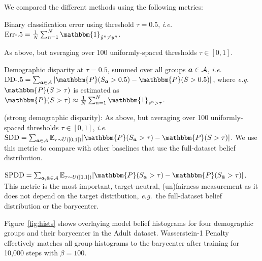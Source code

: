 \documentclass[letterpaper]{article}
\newcommand{\ie}{\emph{i.e.}}
\newcommand{\eg}{\emph{e.g.}}
\theoremstyle{definition}
\newcommand{\Sa}{S_{\va}}
\begin{document}
We compared the different methods using the following metrics:
\begin{description}
\setlength{\itemsep}{-6pt}  
\setlength{\parskip}{-4pt}
\setlength{\parsep}{-4pt}
\item[{\bf Err-.5:}] Binary classification error using threshold $\tau=0.5$, \ie~$\textrm{Err-.5} =\frac{1}{N}\sum_{n=1}^N\mathbbm{1}_{\hat y^n \neq y^n}$.\\
\item[{\bf Err-Exp:}] As above, but averaging over 100 uniformly-spaced thresholds $\tau \in [0,1]$.\\ 
\item[{\bf DD-.5:}] Demographic disparity at $\tau = 0.5$, summed over all groups ${\bm{a}}\in \mathcal{A}$, \ie~$\textrm{DD-.5} = \sum_{\va \in \mathcal{A}} |\mathbbm{P}(\Sa > 0.5) - \mathbbm{P}(S > 0.5)|$, where \eg~$\mathbbm{P}(S > \tau)$ is estimated as $\mathbbm{P}(S > \tau)\approx \frac{1}{N}\sum_{n=1}^N \mathbbm{1}_{s^n > \tau}$.\\
\item[{\bf SDD}] (strong demographic disparity): As above, but averaging over 100 uniformly-spaced thresholds $\tau \in [0,1]$, \ie~$\textrm{SDD}=\sum_{\va \in \mathcal{A}}\mathbb{E}_{\tau\sim U([0,1])} |\mathbbm{P}(S_{\va}>\tau) - \mathbbm{P}(S > \tau)|$. 
We use this metric to compare with other baselines that use the full-dataset belief distribution.\\
\item[{\bf SPDD:}] 
$\textrm{SPDD}=\sum_{\va,\bar\va\in \mathcal{A}} \mathbb{E}_{\tau\sim U([0,1])} |\mathbbm{P}(S_{\va}>\tau) - \mathbbm{P}(S_{\bar\va} > \tau)|$.
This metric is the most important, target-neutral, (un)fairness measurement as it does not depend on the target distribution, \eg~the full-dataset belief distribution or the barycenter.  
\end{description}

Figure~\ref{fig:hists} shows overlaying model belief histograms for four demographic groups and their barycenter in the Adult dataset. Wasserstein-1 Penalty  effectively matches  all group histograms to the barycenter after training for 10,000 steps with $\beta=100$. 
\end{document}
